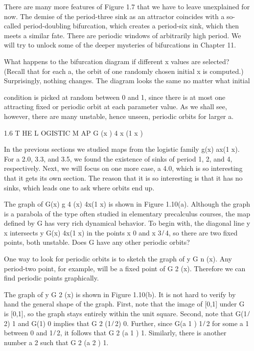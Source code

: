 There are many more features of Figure 1.7 that we have to leave unexplained for now. The demise of the 
period-three sink as an attractor coincides with a so-called period-doubling bifurcation, which creates a 
period-six sink, which then meets a similar fate. There are periodic windows of arbitrarily high period. We 
will try to unlock some of the deeper mysteries of bifurcations in Chapter 11.

What happens to the bifurcation diagram if different x values are selected? (Recall that for each a, the 
orbit of one randomly chosen initial x is computed.) Surprisingly, nothing changes. The diagram looks the 
same no matter what initial

condition is picked at random between 0 and 1, since there is at most one attracting ﬁxed or periodic 
orbit at each parameter value. As we shall see, however, there are many unstable, hence unseen, periodic 
orbits for larger a.

1.6 T HE L OGISTIC M AP G (x )  4 x (1  x )

In the previous sections we studied maps from the logistic family g(x)  ax(1  x). For a  2.0, 3.3, and 3.5, 
we found the existence of sinks of period 1, 2, and 4, respectively. Next, we will focus on one more case, 
a  4.0, which is so interesting that it gets its own section. The reason that it is so interesting is that 
it has no sinks, which leads one to ask where orbits end up.

The graph of G(x)  g 4 (x)  4x(1  x) is shown in Figure 1.10(a). Although the graph is a parabola of the 
type often studied in elementary precalculus courses, the map deﬁned by G has very rich dynamical 
behavior. To begin with, the diagonal line y  x intersects y  G(x)  4x(1  x) in the points x  0 and x  3 ̸ 
4, so there are two ﬁxed points, both unstable. Does G have any other periodic orbits?

One way to look for periodic orbits is to sketch the graph of y  G n (x). Any period-two point, for 
example, will be a ﬁxed point of G 2 (x). Therefore we can ﬁnd periodic points graphically.

The graph of y  G 2 (x) is shown in Figure 1.10(b). It is not hard to verify by hand the general shape of 
the graph. First, note that the image of [0,1] under G is [0,1], so the graph stays entirely within the 
unit square. Second, note that G(1 ̸ 2)  1 and G(1)  0 implies that G 2 (1 ̸ 2)  0. Further, since G(a 1 )  1 
̸ 2 for some a 1 between 0 and 1 ̸ 2, it follows that G 2 (a 1 )  1. Similarly, there is another number a 2 
such that G 2 (a 2 )  1.

